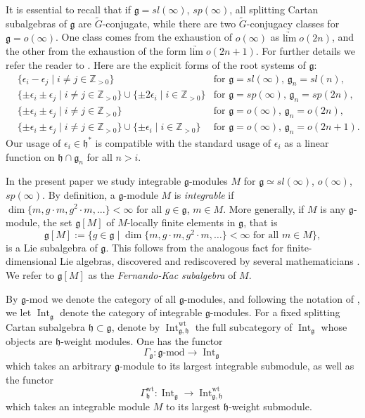 \documentclass{amsart}
\renewcommand{\sl}{sl}
\newcommand{\so}{o}
\renewcommand{\sp}{sp}
\renewcommand{\gg}{\mathfrak{g}}
\newcommand{\hh}{\mathfrak{h}}
\renewcommand{\dim}{\operatorname{dim}}
\newcommand{\ZZ}{\mathbb{Z}}
\newcommand{\limarr}{\underrightarrow{\mathrm{lim}} \;}
\theoremstyle{definition}
\numberwithin{equation}{section}
\begin{document}
It is essential to recall that if $\gg = \sl(\infty)$, $\sp(\infty)$, all splitting Cartan subalgebras of $\gg$ are $\tilde{G}$-conjugate, while there are two $\tilde{G}$-conjugacy classes for $\gg = \so(\infty)$.  One class comes from the exhaustion of $\so(\infty)$ as $\limarr \so(2n)$, and the other from the exhaustion of the form $\limarr \so(2n+1)$.  For further details we refer the reader to \cite{DPS}.  Here are the explicit forms of the root systems of $\gg$:
\begin{align*}
&\{ \epsilon_i - \epsilon_j \mid i \neq j \in \ZZ_{>0} \} &\textrm{for } \gg = \sl(\infty) \textrm{, } \gg_n = \sl(n), \\
&\{ \pm \epsilon_i \pm \epsilon_j \mid i \neq j \in \ZZ_{>0} \} \cup \{ \pm 2 \epsilon_i \mid i \in \ZZ_{>0} \} &\textrm{for } \gg = \sp(\infty)  \textrm{, } \gg_n = \sp(2n), \\
&\{ \pm \epsilon_i \pm \epsilon_j \mid i \neq j \in \ZZ_{>0} \} &\textrm{for } \gg =  \so(\infty) \textrm{, } \gg_n= \so(2n), \\
&\{ \pm \epsilon_i \pm \epsilon_j \mid i \neq j \in \ZZ_{>0} \}  \cup \{ \pm \epsilon_i \mid i \in \ZZ_{>0} \} &\textrm{for } \gg = \so(\infty)  \textrm{, } \gg_n = \so(2n+1). 
\end{align*}
Our usage of $\epsilon_i \in \hh^*$ is compatible with the standard usage of $\epsilon_i$ as a linear function on $\hh \cap \gg_n$ for all $n > i$.

In the present paper we study integrable $\gg$-modules $M$ for $\gg\simeq \sl(\infty)$,
$\so(\infty)$, $\sp(\infty)$. By definition, a $\gg$-module $M$ is
\emph{integrable} if $\dim \{m, g\cdot m, g^2\cdot m, ...\}<\infty$
for all $g\in\gg$, $m \in M$. 
More generally, if $M$ is any $\gg$-module, the set $\gg [ M ]$ of $M$-locally finite elements in $\gg$, that is
$$\gg [ M ] := \{ g \in \gg \mid \dim \{ m , g \cdot m, g^2 \cdot m , \ldots \} < \infty \textrm{ for all } m \in M \},$$
is a Lie subalgebra of $\gg$.  This follows from the analogous fact for finite-dimensional Lie algebras, discovered and rediscovered by several mathematicians \cite{GQS, F, K}.  We refer to $\gg [ M ]$ as the \emph{Fernando-Kac subalgebra} of $M$.

By $\gg$-mod we denote the category of all $\gg$-modules, and  following the notation of \cite{PS}, we let $\operatorname{Int}_\gg$ denote the category of integrable $\gg$-modules.  For a fixed splitting Cartan subalgebra $\hh \subset \gg$, denote by $\operatorname{Int}^\mathrm{wt}_{\gg,\hh}$ the full subcategory of $\operatorname{Int}_\gg$ whose objects are $\hh$-weight modules.  One has the functor
$$\Gamma_\gg : \gg\textrm{-mod} \rightarrow \operatorname{Int}_\gg$$
which takes an arbitrary $\gg$-module to its largest integrable submodule,
as well as the functor
$$\Gamma^\mathrm{wt}_\hh : \operatorname{Int}_\gg \rightarrow \operatorname{Int}^\mathrm{wt}_{\gg,\hh}$$ 
which takes an integrable module $M$ to its largest $\hh$-weight submodule.  
\end{document}
